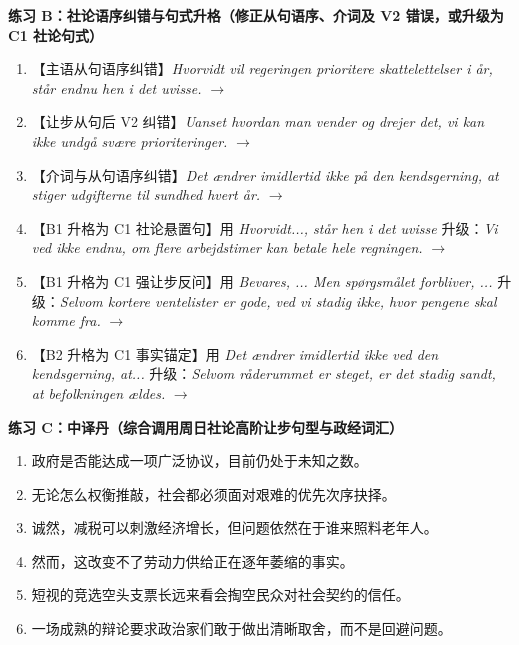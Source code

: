 \textbf{练习 B：社论语序纠错与句式升格（修正从句语序、介词及 V2 错误，或升级为 C1 社论句式）}
\begin{enumerate}
  \item 【主语从句语序纠错】\textit{Hvorvidt vil regeringen prioritere skattelettelser i år, står endnu hen i det uvisse.} $\rightarrow$
  \item 【让步从句后 V2 纠错】\textit{Uanset hvordan man vender og drejer det, vi kan ikke undgå svære prioriteringer.} $\rightarrow$
  \item 【介词与从句语序纠错】\textit{Det ændrer imidlertid ikke på den kendsgerning, at stiger udgifterne til sundhed hvert år.} $\rightarrow$
  \item 【B1 升格为 C1 社论悬置句】用 \textit{Hvorvidt..., står hen i det uvisse} 升级：\textit{Vi ved ikke endnu, om flere arbejdstimer kan betale hele regningen.} $\rightarrow$
  \item 【B1 升格为 C1 强让步反问】用 \textit{Bevares, ... Men spørgsmålet forbliver, ...} 升级：\textit{Selvom kortere ventelister er gode, ved vi stadig ikke, hvor pengene skal komme fra.} $\rightarrow$
  \item 【B2 升格为 C1 事实锚定】用 \textit{Det ændrer imidlertid ikke ved den kendsgerning, at...} 升级：\textit{Selvom råderummet er steget, er det stadig sandt, at befolkningen ældes.} $\rightarrow$
\end{enumerate}

\textbf{练习 C：中译丹（综合调用周日社论高阶让步句型与政经词汇）}
\begin{enumerate}
  \item 政府是否能达成一项广泛协议，目前仍处于未知之数。
  \item 无论怎么权衡推敲，社会都必须面对艰难的优先次序抉择。
  \item 诚然，减税可以刺激经济增长，但问题依然在于谁来照料老年人。
  \item 然而，这改变不了劳动力供给正在逐年萎缩的事实。
  \item 短视的竞选空头支票长远来看会掏空民众对社会契约的信任。
  \item 一场成熟的辩论要求政治家们敢于做出清晰取舍，而不是回避问题。
\end{enumerate}


